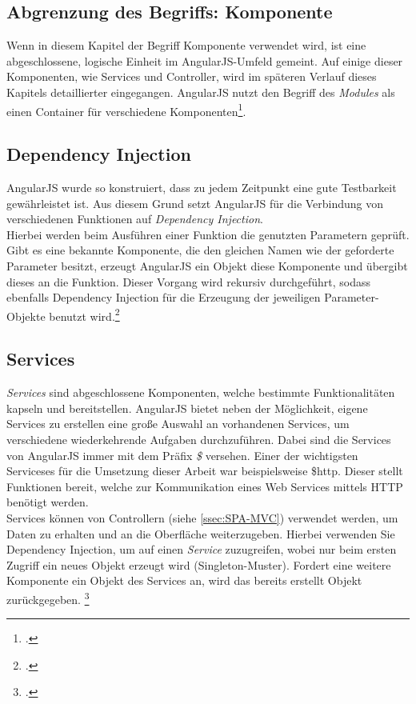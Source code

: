 \subsection{Abgrenzung des Begriffs: Komponente}
Wenn in diesem Kapitel der Begriff Komponente verwendet wird, ist eine abgeschlossene, logische Einheit im AngularJS-Umfeld gemeint. Auf einige dieser Komponenten, wie Services und Controller, wird im späteren Verlauf dieses Kapitels detaillierter eingegangen. AngularJS nutzt den Begriff des \textit{Modules} als einen Container für verschiedene Komponenten\footcite{online:angular:module}. 
\subsection{Dependency Injection}
\label{ssec:SPA-Dependency-Injection}
AngularJS wurde so konstruiert, dass zu jedem Zeitpunkt eine gute Testbarkeit gewährleistet ist. Aus diesem Grund setzt AngularJS für die Verbindung von verschiedenen Funktionen auf \textit{Dependency Injection}. \\ 
Hierbei werden beim Ausführen einer Funktion die genutzten Parametern geprüft. Gibt es eine bekannte Komponente, die den gleichen Namen wie der geforderte Parameter besitzt, erzeugt AngularJS ein Objekt diese Komponente und übergibt dieses an die Funktion. Dieser Vorgang wird rekursiv durchgeführt, sodass ebenfalls Dependency Injection für die Erzeugung der jeweiligen Parameter-Objekte benutzt wird.\footcite{online:angularjs:dependency-injection}
\subsection{Services}
\label{ssec:SPA-Services}
\textit{Services} sind abgeschlossene Komponenten, welche bestimmte Funktionalitäten kapseln und bereitstellen. AngularJS bietet neben der Möglichkeit, eigene Services zu erstellen eine große Auswahl an vorhandenen Services, um verschiedene wiederkehrende Aufgaben durchzuführen. Dabei sind die Services von AngularJS immer mit dem Präfix \textit{\$} versehen. Einer der wichtigsten Serviceses für die Umsetzung dieser Arbeit war beispielsweise \$http. Dieser stellt Funktionen bereit, welche zur Kommunikation eines Web Services mittels \ac{HTTP} benötigt werden. \\
Services können von Controllern (siehe \ref{ssec:SPA-MVC}) verwendet werden, um Daten zu erhalten und an die Oberfläche weiterzugeben. Hierbei verwenden Sie Dependency Injection, um auf einen \textit{Service} zuzugreifen, wobei nur beim ersten Zugriff ein neues Objekt erzeugt wird (\ac{Singleton}-Muster). Fordert eine weitere Komponente ein Objekt des Services an, wird das bereits erstellt Objekt zurückgegeben. \footcite{online:angular:services}
